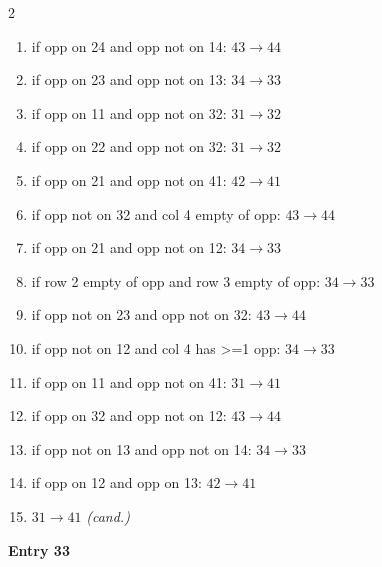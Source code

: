 \begin{multicols}{2}
\begin{tikzpicture}[scale=0.24]
\end{tikzpicture}
\nopagebreak\begin{enumerate}[topsep=1pt,itemsep=0pt,parsep=0pt,leftmargin=2.2em,label=\arabic*.]
\item if opp on 24 and opp not on 14: $43\!\to\!44$
\item if opp on 23 and opp not on 13: $34\!\to\!33$
\item if opp on 11 and opp not on 32: $31\!\to\!32$
\item if opp on 22 and opp not on 32: $31\!\to\!32$
\item if opp on 21 and opp not on 41: $42\!\to\!41$
\item if opp not on 32 and col 4 empty of opp: $43\!\to\!44$
\item if opp on 21 and opp not on 12: $34\!\to\!33$
\item if row 2 empty of opp and row 3 empty of opp: $34\!\to\!33$
\item if opp not on 23 and opp not on 32: $43\!\to\!44$
\item if opp not on 12 and col 4 has >=1 opp: $34\!\to\!33$
\item if opp on 11 and opp not on 41: $31\!\to\!41$
\item if opp on 32 and opp not on 12: $43\!\to\!44$
\item if opp not on 13 and opp not on 14: $34\!\to\!33$
\item if opp on 12 and opp on 13: $42\!\to\!41$
\item $31\!\to\!41$ \hfill\textit{(cand.)}
\end{enumerate}\smallskip
\noindent\textbf{Entry 33} \; 
\end{multicols}
